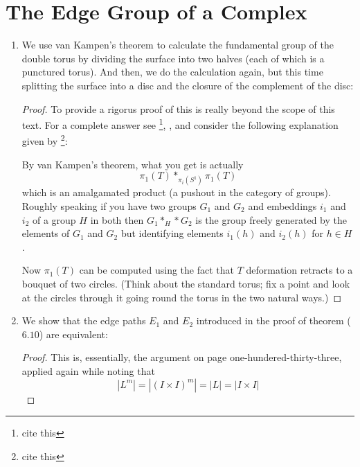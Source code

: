 \documentclass{book}
\begin{document}
\section{The Edge Group of a Complex}
\begin{enumerate}[(1)]
    \item We use van Kampen's theorem to calculate the fundamental group of the double torus by dividing the surface into two halves (each of which is a punctured torus). And then, we do the calculation again, but this time splitting the surface into a disc and the closure of the complement of the disc: 
        \begin{proof} To provide a rigorus proof of this is really beyond the scope of this text. For a complete answer see \footnote{cite this}, \cite{hatcher2002algebraic}, and consider the following explanation given by \footnote{cite this}: 
            \par By van Kampen's theorem, what you get is actually
            $$\pi_1(T)\ast_{\pi_i(S^1)}\pi_1(T)$$
            which is an amalgamated product (a pushout in the category of groups).
            Roughly speaking if you have two groups $G_1$ and $G_2$ and
            embeddings $i_1$ and $i_2$ of a group $H$ in both then $G_1\ast_H\ast G_2$
            is the group freely generated by the elements of $G_1$ and $G_2$
            but identifying elements $i_1(h)$ and $i_2(h)$ for $h\in H$.
            \par Now $\pi_1(T)$ can be computed using the fact that $T$ deformation retracts
            to a bouquet of two circles. (Think about the standard torus; fix a point
            and look at the circles through it going round the torus in the two natural
            ways.)
        \end{proof}

    \item We show that the edge paths $E_1$ and $E_2$ introduced in the proof of theorem ($6.10$) are equivalent: 
        \begin{proof} This is, essentially, the argument on page one-hundered-thirty-three, applied again while noting that 
            \[|L^m| = |(I \times I)^m| = |L| = |I \times I| \]
        \end{proof}


\end{enumerate}
\end{document}
